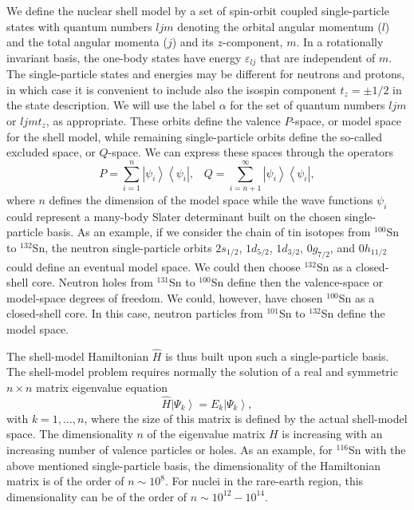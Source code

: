 \documentclass[rmp,aps,floatfix]{revtex4}
\begin{document}
We define the nuclear shell model by a set of spin-orbit coupled
single-particle states
with quantum numbers $ljm$ denoting the orbital angular momentum ($l$) and
the total angular momenta ($j$) and its $z$-component, $m$.  In a
rotationally invariant basis, the one-body states have energy
$\varepsilon_{lj}$ that are independent of $m$.  
The single-particle states and energies may be different
for neutrons and protons, in which case it is 
convenient to include also the isospin component
$t_z=\pm 1/2$ in the state description.  
We will use the label $\alpha$ for the set of quantum
numbers $ljm$ or $ljmt_z$, as appropriate.
These orbits define the 
valence $P$-space, or model space for the shell model, 
while remaining single-particle
orbits define the so-called  excluded space, or $Q$-space. We can express
these spaces through the operators
\begin{equation}
P = \sum_{i = 1}^n \left | \psi_i\right\rangle \left \langle \psi_i\right |  ,
\;\;\;
Q = \sum_{i = n+1}^{\infty} \left |\psi_i\right\rangle \left \langle \psi_i\right |,
\end{equation}
where $n$ defines the dimension of the model space while the wave functions
$\psi_i$ could represent a many-body Slater determinant built on 
the chosen single-particle basis. 
As an example, if we consider 
the chain of tin isotopes from $^{100}$Sn to $^{132}$Sn, the
neutron single-particle orbits 
$2s_{1/2}$, $1d_{5/2}$, $1d_{3/2}$, $0g_{7/2}$, and $0h_{11/2}$ could define
an eventual model space. 
We could then choose 
$^{132}$Sn as a closed-shell core. Neutron holes from 
$^{131}$Sn to $^{100}$Sn define then the valence-space or model-space 
degrees of freedom. We could, however,
have chosen $^{100}$Sn as a closed-shell core.
In this case, neutron particles from $^{101}$Sn to $^{132}$Sn
define the model space.

The shell-model Hamiltonian $\hat{H}$ is thus built upon such a 
single-particle basis. 
The shell-model problem requires normally the solution of a real and symmetric
$n \times n$ matrix eigenvalue equation
\begin{equation}
\hat{H}\left | \Psi_k\right\rangle  = 
       E_k \left | \Psi_k\right\rangle,
\end{equation}
with $k = 1,\ldots, n$, where the size of this matrix is defined by the 
actual shell-model space. 
The dimensionality
$n$ of the eigenvalue matrix $H$ is increasing
with an increasing number of valence particles or holes. As an example,
for $^{116}$Sn with the above mentioned single-particle basis,
the dimensionality of the Hamiltonian matrix is of  
the order of  $n \sim 10^{8}$. For nuclei in the rare-earth 
region, this dimensionality can be of the order of
$n \sim 10^{12}-10^{14}$.
\end{document}
